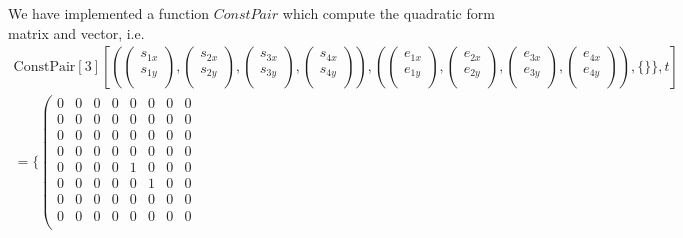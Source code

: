 \documentclass[8pt]{article}
\begin{document}
\begin{screen}
 We have implemented a function $ConstPair$ which compute the quadratic form matrix and vector, i.e.\\
\begin{eqnarray*}
\text{ConstPair}[3][(\left(\begin{array}{c}
s_{1x}\\
s_{1y}\\
\end{array}\right),\left(\begin{array}{c}
s_{2x}\\
s_{2y}\\
\end{array}\right),\left(\begin{array}{c}
s_{3x}\\
s_{3y}\\
\end{array}\right),\left(\begin{array}{c}
s_{4x}\\
s_{4y}\\
\end{array}\right)),(\left(\begin{array}{c}
e_{1x}\\
e_{1y}\\
\end{array}\right),\left(\begin{array}{c}
e_{2x}\\
e_{2y}\\
\end{array}\right),\left(\begin{array}{c}
e_{3x}\\
e_{3y}\\
\end{array}\right),\left(\begin{array}{c}
e_{4x}\\
e_{4y}\\
\end{array}\right)), \{\}\}, t] \\
=\{\left(
     \begin{array}{cccccccc}
 	0&0&0&0&0&0&0&0\\
	0&0&0&0&0&0&0&0\\
	0&0&0&0&0&0&0&0\\
	0&0&0&0&0&0&0&0\\
	0&0&0&0&1&0&0&0\\
	0&0&0&0&0&1&0&0\\
	0&0&0&0&0&0&0&0\\
	0&0&0&0&0&0&0&0\\

\end{array}
\end{eqnarray*}
\end{screen}
\end{document}
